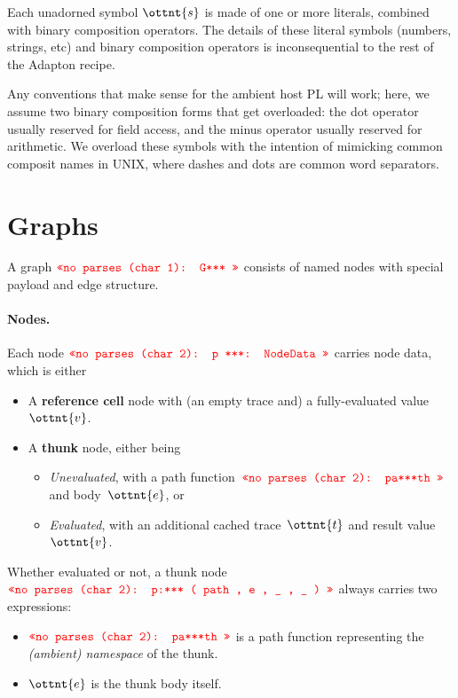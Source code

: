 \documentclass[11pt]{article}
\begin{document}
\ottgrammartabular{
  \otts
}

Each unadorned symbol $\ottnt{s}$ is made of one or more literals,
combined with binary composition operators.
%
The details of these literal symbols (numbers, strings, etc) and
binary composition operators is inconsequential to the rest of the
Adapton recipe.

Any conventions that make sense for the ambient host PL will work;
here, we assume two binary composition forms that get overloaded: the
dot operator usually reserved for field access, and the minus operator
usually reserved for arithmetic.
%
We overload these symbols with the intention of mimicking common
composit names in UNIX, where dashes and dots are common word
separators.

\section{Graphs}

A graph $\texttt{\textcolor{red}{<<no parses (char 1): G*** >>}}$ consists of named nodes with special payload and edge
structure.
  
\ottgrammartabular{
  \ottGraph
}

\ottgrammartabular{
  \ottnode
}


\paragraph{Nodes.}

Each node $\texttt{\textcolor{red}{<<no parses (char 2): p ***: NodeData >>}}$ carries node data, which is either

\begin{itemize}
\item A \textbf{reference cell} node with (an empty trace and) a fully-evaluated value~$\ottnt{v}$.
\item A \textbf{thunk} node, either being
  \begin{itemize}
  \item \emph{Unevaluated}, with a path function~$\texttt{\textcolor{red}{<<no parses (char 2): pa***th >>}}$ and body~$\ottnt{e}$, or
  \item \emph{Evaluated}, with an additional cached trace~$\ottnt{t}$ and result value~$\ottnt{v}$.
  \end{itemize} 
\end{itemize}

Whether evaluated or not, a thunk node~$\texttt{\textcolor{red}{<<no parses (char 2): p:*** ( path , e , \_ , \_ ) >>}}$ always
carries two expressions:
\begin{itemize}
\item $\texttt{\textcolor{red}{<<no parses (char 2): pa***th >>}}$ is a path function representing the \emph{(ambient) namespace} of the thunk.
\item $\ottnt{e}$ is the thunk body itself.
\end{itemize}
\end{document}
